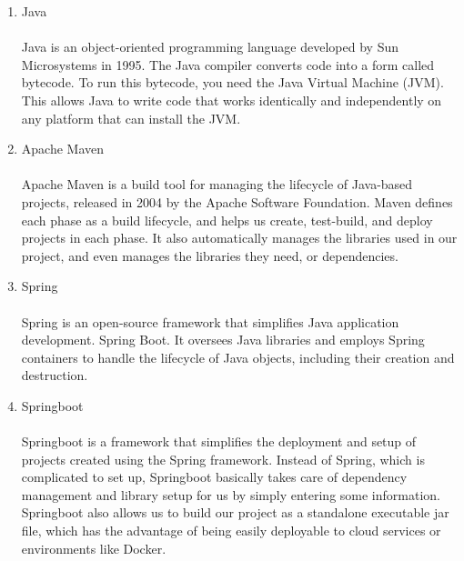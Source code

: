 \begin{enumerate}[label=\arabic*]
\begin{enumerate}[label=\alph*.]
              \item Java\\
                    \\
                    Java is an object-oriented programming language developed by Sun Microsystems in 1995. The Java compiler converts code into a form called bytecode. To run this bytecode, you need the Java Virtual Machine (JVM). This allows Java to write code that works identically and independently on any platform that can install the JVM. \\

              \item Apache Maven\\
                    \\
                    Apache Maven is a build tool for managing the lifecycle of Java-based projects, released in 2004 by the Apache Software Foundation. Maven defines each phase as a build lifecycle, and helps us create, test-build, and deploy projects in each phase. It also automatically manages the libraries used in our project, and even manages the libraries they need, or dependencies.\\

              \item Spring\\
                    \\
                    Spring is an open-source framework that simplifies Java application development. Spring Boot. It oversees Java libraries and employs Spring containers to handle the lifecycle of Java objects, including their creation and destruction.\\

              \item Springboot\\
                    \\
                    Springboot is a framework that simplifies the deployment and setup of projects created using the Spring framework. Instead of Spring, which is complicated to set up, Springboot basically takes care of dependency management and library setup for us by simply entering some information. Springboot also allows us to build our project as a standalone executable jar file, which has the advantage of being easily deployable to cloud services or environments like Docker.\\


\end{enumerate}
\end{enumerate}

